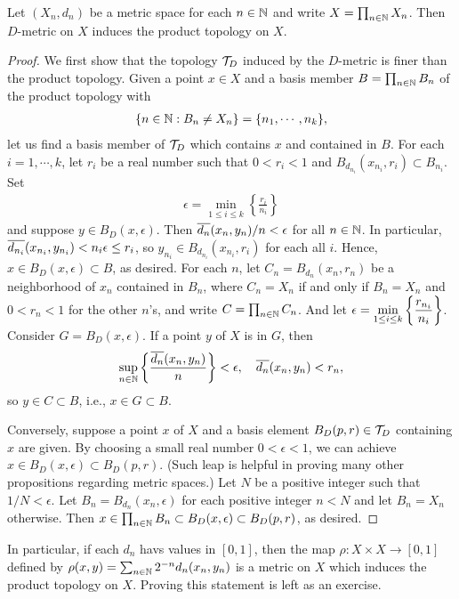 \begin{thm}
    Let $(X_n, d_n)$ be a metric space for each $n\in{\mathbb{N}}$ and write $X=\prod_{n\in{\mathbb{N}}} X_n$.
    Then $D$-metric on $X$ induces the product topology on $X$.
\end{thm}
\begin{proof}
    We first show that the topology ${\mathcal{T}}_D$ induced by the $D$-metric is finer than the product topology.
    Given a point $x\in X$ and a basis member $B=\prod_{n\in{\mathbb{N}}}B_n$ of the product topology with
    \begin{align*}
        \displaystyle{\{n\in{\mathbb{N}}:B_n\neq X_n\}=\{n_1, \cdots, n_k\}},
    \end{align*}
    let us find a basis member of ${\mathcal{T}}_D$ which contains $x$ and contained in $B$.
    For each $i=1, \cdots, k$, let $r_i$ be a real number such that $0<r_i<1$ and $B_{d_{n_i}}(x_{n_i}, r_i)\subset B_{n_i}$.
    Set
    \begin{align*}
        \epsilon=\min_{1\leq i\leq k}\left\{\frac{r_i}{n_i}\right\}
    \end{align*}
    and suppose $y\in B_D(x, \epsilon)$.
    Then $\overline{d_n}(x_n, y_n)/n<\epsilon$ for all $n\in{\mathbb{N}}$.
    In particular, $\overline{d_{n_i}}(x_{n_i}, y_{n_i})<n_i\epsilon\leq r_i$, so $y_{n_i}\in B_{d_{n_i}}(x_{n_i}, r_i)$ for each all $i$.
    Hence, $x\in B_D(x, \epsilon)\subset B$, as desired.
    \ifinclude\else
    For each $n$, let $C_n=B_{d_n}(x_n, r_n)$ be a neighborhood of $x_n$ contained in $B_n$, where $C_n=X_n$ if and only if $B_n=X_n$ and $0<r_n<1$ for the other $n$'s, and write $C=\prod_{n\in{\mathbb{N}}}C_n$.
    And let $\displaystyle{\epsilon=\min_{1\leq i\leq k}\left\{\frac{r_{n_i}}{n_i}\right\}}$.
    Consider $G=B_D(x, \epsilon)$.
    If a point $y$ of $X$ is in $G$, then
    \begin{align*}
        \sup_{n\in{\mathbb{N}}}\left\{\frac{\overline{d_n}(x_n, y_n)}{n}\right\} < \epsilon,\quad\overline{d_n}(x_n, y_n) < r_n,
    \end{align*}
    so $y\in C\subset B$, i.e., $x\in G\subset B$.
    \fi
    
    Conversely, suppose a point $x$ of $X$ and a basis element $B_D(p, r)\in {\mathcal{T}}_D$ containing $x$ are given.
    By choosing a small real number $0<\epsilon<1$, we can achieve $x\in B_D(x, \epsilon)\subset B_D(p, r)$.
    \color{teal}(Such leap is helpful in proving many other propositions regarding metric spaces.) \color{black}
    Let $N$ be a positive integer such that $1/N < \epsilon$.
    Let $B_n=B_{d_n}(x_n, \epsilon)$ for each positive integer $n<N$ and let $B_n=X_n$ otherwise.
    Then $x\in\prod_{n\in{\mathbb{N}}}B_n\subset B_D(x, \epsilon)\subset B_D(p, r)$, as desired.
\end{proof}
\begin{rmk}
    In particular, if each $d_n$ havs values in $[0, 1]$, then the map $\rho: X\times X \rightarrow [0, 1]$ defined by $\rho(x, y)=\sum_{n\in{\mathbb{N}}} 2^{-n} d_n(x_n, y_n)$ is a metric on $X$ which induces the product topology on $X$.
    \color{brown}Proving this statement is left as an exercise. \color{black}
\end{rmk}

